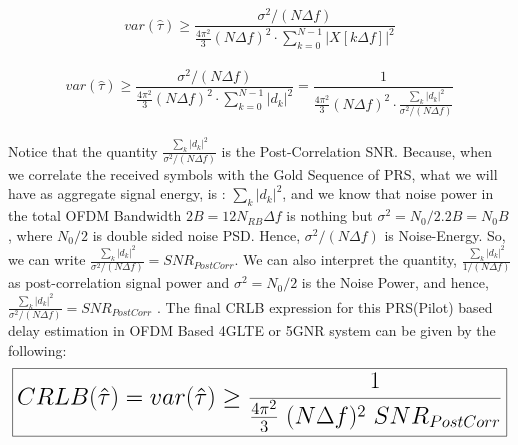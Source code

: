 \documentclass{article}
\begin{document}
$$var(\hat{\tau}) \ge \frac{\sigma^2/(N\Delta f)}{\frac{4\pi^2}{3}(N\Delta f)^2 \cdot \sum^{N-1}_{k=0}|X[k\Delta f]|^2}$$ 
\\
$$ var(\hat{\tau}) \ge \frac{\sigma^2/(N\Delta f)}{\frac{4\pi^2}{3}(N\Delta f)^2 \cdot \sum^{N-1}_{k=0}|d_k|^2} = \frac{1}{\frac{4\pi^2}{3}(N\Delta f)^2 \cdot \frac{\sum_{k}|d_k|^2}{\sigma^2/(N\Delta f)}}$$
\\
Notice that the quantity $\frac{\sum_{k}|d_k|^2}{\sigma^2/(N\Delta f)}$ is the Post-Correlation SNR. Because, when we correlate the received symbols with the Gold Sequence of PRS, what we will have as aggregate signal energy, is : $\sum_{k}|d_k|^2$, and we know that noise power in the total OFDM Bandwidth $2B = 12N_{RB}\Delta f$ is nothing but $\sigma^2 = N_0/2.2B = N_0B$, where $N_0/2$ is double sided noise PSD. Hence, $\sigma^2/(N\Delta f)$ is Noise-Energy. So, we can write $\frac{\sum_{k}|d_k|^2}{\sigma^2/(N\Delta f)} = {SNR}_{PostCorr}$. We can also interpret the quantity, $\frac{\sum_{k}|d_k|^2}{1/(N\Delta f)}$ as post-correlation signal power and $\sigma^2 = N_0/2$ is the Noise Power, and hence, $\frac{\sum_{k}|d_k|^2}{\sigma^2/(N\Delta f)} = {SNR}_{PostCorr}$  . The final CRLB expression for this PRS(Pilot) based delay estimation in OFDM Based 4GLTE or 5GNR system can be given by the following:
\\
\begin{equation} \label{eq9}
\LARGE
\boxed{CRLB(\hat{\tau}) = var(\hat{\tau}) \ge \frac{1}{\frac{4\pi^2}{3} \ (N\Delta f)^2 \ {SNR}_{PostCorr}} }
\end{equation}
\end{document}
